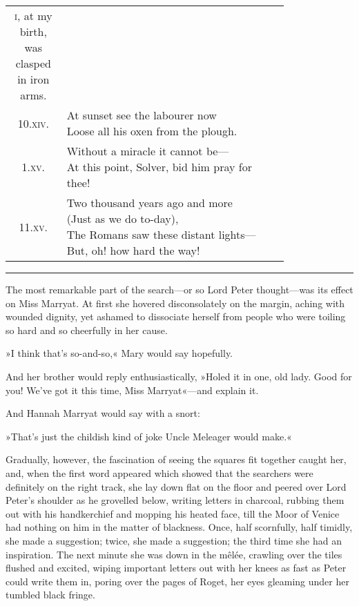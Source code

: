 \begin{longtable} {c p{0.8\linewidth}}
{\textsc{i}, at my birth, was clasped in iron arms.}\\
\textsc{10.xiv.} &  \makecell[l]{At sunset see the labourer now\\
Loose all his oxen from the plough.}\\
\textsc{1.xv.} &  \makecell[l]{Without a miracle it cannot be—\\
At this point, Solver, bid him pray for thee!}\\[.3cm] 
\textsc{11.xv.} &  \makecell[l]{Two thousand years ago and more\\
(Just as we do to-day),\\
The Romans saw these distant lights—\\
But, oh! how hard the way!}
\end{longtable}

\noindent\hfil\rule{0.5\textwidth}{.4pt}\hfil 

The most remarkable part of the search—or so Lord Peter thought—was its effect on Miss Marryat. At first she hovered disconsolately on the margin, aching with wounded dignity, yet ashamed to dissociate herself from people who were toiling so hard and so cheerfully in her cause.

»I think that's so-and-so,« Mary would say hopefully.

And her brother would reply enthusiastically, »Holed it in one, old lady. Good for you! We've got it this time, Miss Marryat«—and explain it.

And Hannah Marryat would say with a snort:

»That's just the childish kind of joke Uncle Meleager would make.«

Gradually, however, the fascination of seeing the squares fit together caught her, and, when the first word appeared which showed that the searchers were definitely on the right track, she lay down flat on the floor and peered over Lord Peter's shoulder as he grovelled below, writing letters in charcoal, rubbing them out with his handkerchief and mopping his heated face, till the Moor of Venice had nothing on him in the matter of blackness. Once, half scornfully, half timidly, she made a suggestion; twice, she made a suggestion; the third time she had an inspiration. The next minute she was down in the mêlée, crawling over the tiles flushed and excited, wiping important letters out with her knees as fast as Peter could write them in, poring over the pages of Roget, her eyes gleaming under her tumbled black fringe.

